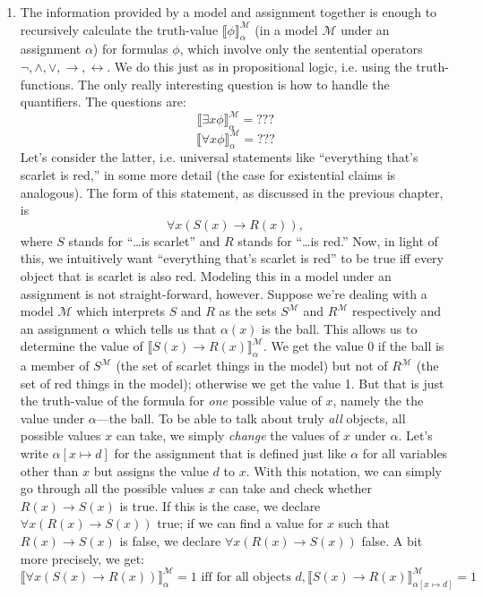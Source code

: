 \begin{enumerate}[\thesection.1]
		\item The information provided by a model and assignment together is enough to recursively calculate the truth-value $\llbracket\phi\rrbracket^\mathcal{M}_\alpha$ (in a model $\mathcal{M}$ under an assignment $\alpha$) for formulas $\phi$, which involve only the sentential operators $\neg,\land,\lor,\to,\leftrightarrow$. We do this just as in propositional logic, i.e. using the truth-functions. The only really interesting question is how to handle the quantifiers. The questions are: \[\llbracket \exists x\phi\rrbracket^\mathcal{M}_\alpha=???\]\[\llbracket \forall x\phi\rrbracket^\mathcal{M}_\alpha=???\] Let's consider the latter, i.e. universal statements like ``everything that's scarlet is red,'' in some more detail (the case for existential claims is analogous). The form of this statement, as discussed in the previous chapter, is \[\forall x(S(x)\to R(x)),\] where $S$ stands for ``\dots is scarlet'' and $R$ stands for ``\dots is red.'' Now, in light of this, we intuitively want ``everything that's scarlet is red'' to be true iff every object that is scarlet is also red. Modeling this in a model under an assignment is not straight-forward, however. Suppose we're dealing with a model $\mathcal{M}$ which interprets $S$ and $R$ as the sets $S^\mathcal{M}$ and $R^\mathcal{M}$ respectively and an assignment $\alpha$ which tells us that $\alpha(x)$ is the ball. This allows us to determine the value of $\llbracket S(x)\to R(x)\rrbracket^\mathcal{M}_\alpha$. We get the value $0$ if the ball is a member of $S^\mathcal{M}$ (the set of scarlet things in the model) but not of $R^\mathcal{M}$ (the set of red things in the model); otherwise we get the value 1. But that is just the truth-value of the formula for \emph{one} possible value of $x$, namely the the value under $\alpha$---the ball. To be able to talk about truly \emph{all} objects, all possible values $x$ can take, we simply \emph{change} the values of $x$ under $\alpha$. Let's write $\alpha[x\mapsto d]$ for the assignment that is defined just like $\alpha$ for all variables other than $x$ but assigns the value $d$ to $x$. With this notation, we can simply go through all the possible values $x$ can take and check whether $R(x)\to S(x)$ is true. If this is the case, we declare $\forall x(R(x)\to S(x))$ true; if we can find a value for $x$ such that $R(x)\to S(x)$ is false, we declare $\forall x(R(x)\to S(x))$ false. A bit more precisely, we get:
		\[\llbracket \forall x(S(x)\to R(x))\rrbracket^\mathcal{M}_\alpha=1\text{ iff for all objects }d,\llbracket S(x)\to R(x)\rrbracket^\mathcal{M}_{\alpha[x\mapsto d]}=1\]

\end{enumerate}

